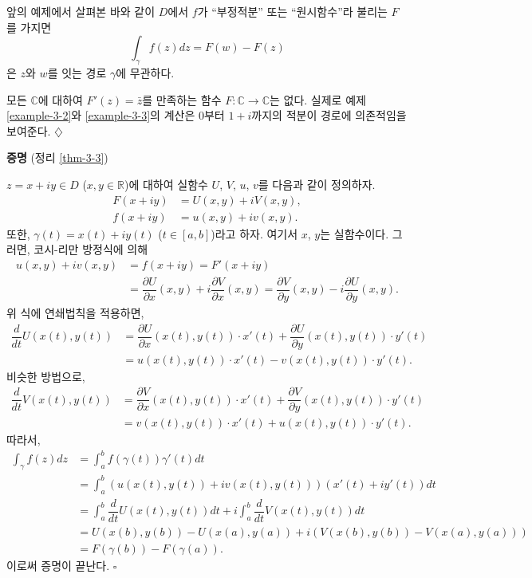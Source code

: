 앞의 예제에서 살펴본 바와 같이 
$D$에서 $f$가 ``부정적분'' 또는 ``원시함수''라 불리는 $F$를 가지면
\[
\int_\gamma f(z)dz = F(w) - F(z)
\]
은 $z$와 $w$를 잇는 경로 $\gamma$에 무관하다.

\begin{salt_example}\label{example-3-6}
모든 $\mathbb C$에 대하여 
$F'(z) = \bar z$를 만족하는 함수 $F:\mathbb C \to \mathbb C$는 없다.
실제로 예제 \ref{example-3-2}와 \ref{example-3-3}의 계산은
$0$부터 $1+i$까지의 적분이 경로에 의존적임을 보여준다.
\hfill $\diamondsuit$
\end{salt_example}

{\bf 증명} (정리 \ref{thm-3-3})

$z = x+iy\in D$ ($x,y\in \mathbb R$)에 대하여
실함수 $U$, $V$, $u$, $v$를 다음과 같이 정의하자.
\begin{align*}
F(x+iy) &= U(x,y) + iV(x,y), \\
f(x+iy) &= u(x,y) + iv(x,y).
\end{align*}
또한, $\gamma(t) = x(t) + iy(t)$ ($t\in[a,b]$)라고 하자.
여기서 $x$, $y$는 실함수이다.
그러면, 코시-리만 방정식에 의해
\begin{align*}
u(x,y) + iv(x,y) 
&= f(x+iy) = F'(x+iy) \\
&= \dfrac{\partial U}{\partial x}(x,y) + i \dfrac{\partial V}{\partial x}(x,y)
= \dfrac{\partial V}{\partial y}(x,y) - i \dfrac{\partial U}{\partial y}(x,y).
\end{align*}
위 식에 연쇄법칙을 적용하면,
\begin{align*}
\dfrac d{dt} U(x(t), y(t))
&= \dfrac{\partial U}{\partial x}(x(t),y(t))\cdot x'(t)
 + \dfrac{\partial U}{\partial y}(x(t),y(t))\cdot y'(t) \\
&= u(x(t),y(t))\cdot x'(t) - v(x(t),y(t))\cdot y'(t).
\end{align*}
비슷한 방법으로,
\begin{align*}
\dfrac d{dt} V(x(t), y(t))
&= \dfrac{\partial V}{\partial x}(x(t),y(t))\cdot x'(t)
 + \dfrac{\partial V}{\partial y}(x(t),y(t))\cdot y'(t) \\
&= v(x(t),y(t))\cdot x'(t) + u(x(t),y(t))\cdot y'(t).
\end{align*}
따라서,
\begin{align*}
\int_\gamma f(z)dz
&= \int_a^b f(\gamma(t))\gamma'(t)dt \\
&= \int_a^b \left( u(x(t), y(t)) + iv(x(t),y(t)) \right) (x'(t)+iy'(t))dt \\
&= \int_a^b \dfrac d{dt} U(x(t), y(t))dt + i \int_a^b \dfrac d{dt} V(x(t), y(t))dt \\
&= U(x(b), y(b)) - U(x(a), y(a)) + 
i\left( V(x(b), y(b)) - V(x(a), y(a)) \right) \\
&= F(\gamma(b)) - F(\gamma(a)).
\end{align*}
이로써 증명이 끝난다. \hfill $\square$

